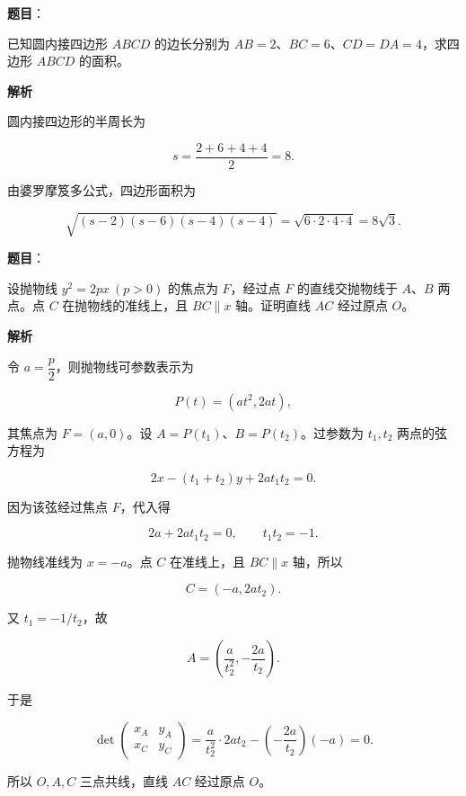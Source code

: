 \begin{answer}

\textbf{题目}：

已知圆内接四边形 $ABCD$ 的边长分别为 $AB=2$、$BC=6$、$CD=DA=4$，求四边形 $ABCD$ 的面积。

\textbf{解析}

圆内接四边形的半周长为

\nopagebreak[4]
\[
s=\frac{2+6+4+4}{2}=8.
\]

由婆罗摩笈多公式，四边形面积为

\nopagebreak[4]
\[
\sqrt{(s-2)(s-6)(s-4)(s-4)}
=\sqrt{6\cdot2\cdot4\cdot4}
=8\sqrt3.
\]


\end{answer}
\begin{answer}

\textbf{题目}：

设抛物线 $y^2=2px\ (p>0)$ 的焦点为 $F$，经过点 $F$ 的直线交抛物线于 $A$、$B$ 两点。点 $C$ 在抛物线的准线上，且 $BC\parallel x$ 轴。证明直线 $AC$ 经过原点 $O$。

\textbf{解析}

令 $a=\dfrac p2$，则抛物线可参数表示为

\nopagebreak[4]
\[
P(t)=(at^2,2at),
\]

其焦点为 $F=(a,0)$。设 $A=P(t_1)$、$B=P(t_2)$。过参数为 $t_1,t_2$ 两点的弦方程为

\nopagebreak[4]
\[
2x-(t_1+t_2)y+2at_1t_2=0.
\]

因为该弦经过焦点 $F$，代入得

\nopagebreak[4]
\[
2a+2at_1t_2=0,\qquad t_1t_2=-1.
\]

抛物线准线为 $x=-a$。点 $C$ 在准线上，且 $BC\parallel x$ 轴，所以

\nopagebreak[4]
\[
C=(-a,2at_2).
\]

又 $t_1=-1/t_2$，故

\nopagebreak[4]
\[
A=\left(\frac a{t_2^2},-\frac{2a}{t_2}\right).
\]

于是

\nopagebreak[4]
\[
\det\begin{pmatrix}
x_A & y_A\\
x_C & y_C
\end{pmatrix}
=\frac a{t_2^2}\cdot2at_2
-\left(-\frac{2a}{t_2}\right)(-a)=0.
\]

所以 $O,A,C$ 三点共线，直线 $AC$ 经过原点 $O$。


\end{answer}

